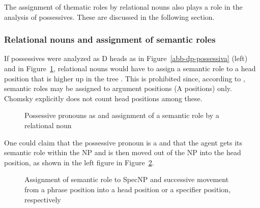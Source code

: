 \documentclass[output=paper
  ,nobabel
  ,draftmode
  ,uniformtopskip %
  ,colorlinks, citecolor=brown
]{langscibook}
\begin{document}
The assignment of thematic roles by relational nouns also plays a role in the analysis of
possessives. These are discussed in the following section.

\subsubsection{Relational nouns and assignment of semantic roles}
\label{sec-relational-nouns-and-semantic-roles}

If possessives were analyzed as D heads as in Figure~\ref{abb-dp-possessiva} (left) and in
Figure~\ref{abb-possessivpronomen-dnull}, relational nouns would have to assign a semantic role to a
head position that is higher up in the tree \citep[]{Olsen91b}. This is prohibited since, according to \citet[]{Chomsky81a}, semantic roles may be assigned to argument positions (A positions) only. Chomsky
explicitly does not count head positions among these.
\begin{figure}
\centerline{
}
\caption{Possessive pronouns as \dnull and assignment of a semantic role by a relational noun}\label{abb-possessivpronomen-dnull}
\end{figure}
One could claim that the possessive pronoun is a \dnull and that the agent gets its semantic role
within the NP and is then moved out of the NP into the head position, as shown in the left figure
in Figure~\ref{abb-rollenzuweisung-rel-nom}. 
\begin{figure}
\hfill
{}
\hfill\hfill
{}
\hfill\mbox{}
\caption{Assignment of semantic role to SpecNP and successive movement from a phrase position into a
  head position or a specifier position, respectively}\label{abb-rollenzuweisung-rel-nom}
\end{figure}
\end{document}

